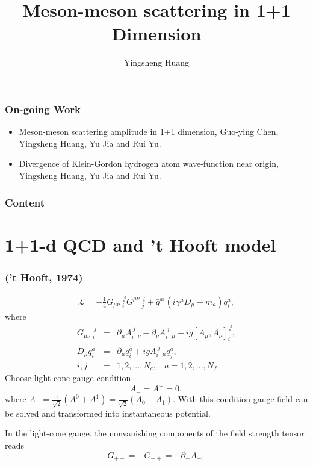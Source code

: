 \documentclass[8pt]{beamer}
\title{Meson-meson scattering in 1+1 Dimension%
}
\author{Yingsheng Huang}
\institute{Institute of High Energy Physics
}
\begin{document}
\maketitle

\begin{frame}
	\frametitle{On-going Work}
	\begin{itemize}
		\item Meson-meson scattering amplitude in 1+1 dimension, Guo-ying Chen, Yingsheng Huang, Yu Jia and Rui Yu.
		\item Divergence of Klein-Gordon hydrogen atom wave-function near origin, Yingsheng Huang, Yu Jia and Rui Yu.
	\end{itemize}
\end{frame}

\begin{frame}
	\frametitle{Content}
	\tableofcontents


\end{frame}

\section{1+1-d QCD and 't Hooft model }
\begin{frame}
	\frametitle{\insertsectionhead ('t Hooft, 1974)}
	\begin{eqnarray}
		\mathcal{L}=-\frac{1}{4}G_{\mu\nu}\ _{i}^{\ j}G^{\mu\nu}\ _{j}^{\
		i}+\bar q^{a i}(i\gamma^\mu D_\mu-m_a)q_i^a,
	\end{eqnarray}
	where
	\begin{eqnarray}
		G_{\mu\nu}\ _{i}^{\ j}&=&\partial_{\mu} A_{i}^{\ j}\
		_{\nu}-\partial_\nu A_{i}^{\ j}\ _{\mu}+i g[A_\mu,A_\nu]_{i}^{\
				j},\nonumber\\
		D_\mu q_i^a&=&\partial_\mu q_i^a+ig A_i^{\ j}\ _\mu q_j^a,\nonumber\\
		i,j&=&1,2,...,N_c, \ \ \ \ a=1,2,...,N_f.
	\end{eqnarray}
	Choose light-cone gauge condition
	\begin{equation}
		A_{-}=A^{+}=0,
	\end{equation}
	where
	$A_{-}=\frac{1}{\sqrt{2}}(A^0+A^1)=\frac{1}{\sqrt{2}}(A_0-A_1)$. With this condition gauge field can be solved and transformed into instantaneous potential.

	In
	the light-cone gauge, the nonvanishing components of the field
	strength tensor reads
	\begin{equation}
		G_{+-}=-G_{-+}=-\partial_{-}A_{+},
	\end{equation}


\end{frame}
\end{document}
